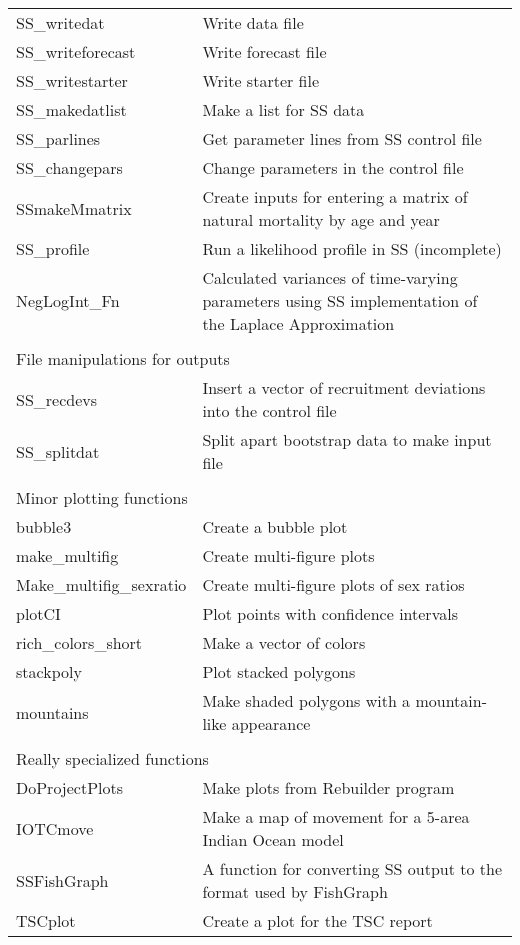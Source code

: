 \begin{center}
\begin{longtable}{p{4.5cm} p{10.52cm}}
		SS\_writedat  & Write data file \\
		SS\_writeforecast & Write forecast file \\
		SS\_writestarter  & Write starter file \\
		SS\_makedatlist   & Make a list for SS data \\
		SS\_parlines      & Get parameter lines from SS control file \\
		SS\_changepars    & Change parameters in the control file \\
		SSmakeMmatrix     & Create inputs for entering a matrix of natural mortality by age and year \\
		SS\_profile       & Run a likelihood profile in SS (incomplete) \\
		NegLogInt\_Fn     & Calculated variances of time-varying parameters using SS implementation of the Laplace Approximation \\
		\hline
		\\
		\multicolumn{2}{l}{File manipulations for outputs}\\
		\hline
		SS\_recdevs      & Insert a vector of recruitment deviations into the control file \\
		SS\_splitdat     & Split apart bootstrap data to make input file \\
		\hline
		\\
		\multicolumn{2}{l}{Minor plotting functions}\\
		\hline
		bubble3          & Create a bubble plot \\
		make\_multifig   & Create multi-figure plots \\
		Make\_multifig\_sexratio & Create multi-figure plots of sex ratios \\
		plotCI           & Plot points with confidence intervals \\
		rich\_colors\_short & Make a vector of colors \\
		stackpoly        & Plot stacked polygons \\
		mountains        & Make shaded polygons with a mountain-like appearance \\
		\hline
		\\
		\multicolumn{2}{l}{Really specialized functions} \\
		\hline
		DoProjectPlots   & Make plots from Rebuilder program \\
		IOTCmove         & Make a map of movement for a 5-area Indian Ocean model \\
		SSFishGraph      & A function for converting SS output to the format used by FishGraph \\
		TSCplot          & Create a plot for the TSC report \\
		\hline
	\end{longtable}
\end{center}
